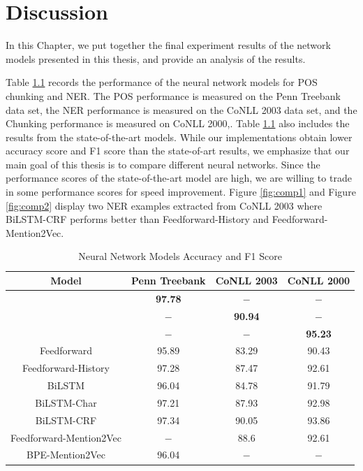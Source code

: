 \chapter{Discussion}

In this Chapter, we put together the final experiment results of the network models presented in this thesis, and provide an analysis of the results.

Table \ref{table:my-label1} records the performance of the neural network models for POS chunking and NER. The POS performance is measured on the Penn Treebank data set, the NER performance is measured on the CoNLL 2003 data set, and the Chunking performance is measured on CoNLL 2000,. Table \ref{table:my-label1} also includes the results from the state-of-the-art models. While our implementations obtain lower accuracy score and F1 score than the state-of-art results, we emphasize that our main goal of this thesis is to compare different neural networks. Since the performance scores of the state-of-the-art model are high, we are willing to trade in some performance scores for speed improvement. Figure \ref{fig:comp1} and Figure \ref{fig:comp2} display two NER examples extracted from CoNLL 2003 where BiLSTM-CRF performs better than Feedforward-History and Feedforward-Mention2Vec. 


\begin{table}[]
\centering
\caption{Neural Network Models Accuracy and F1 Score}
\label{table:my-label1}
\begin{tabular}{|c|c|c|c|}
\hline
Model        & Penn Treebank & CoNLL 2003 & CoNLL 2000     \\ \hline
\text{\cite{ling2015finding}} & \textbf{97.78} & $-$ & $-$ \\ \hline
\text{\cite{lample2016neural}} & $-$ & \textbf{90.94}  & $-$\\ \hline 
\text{\cite{shen2005voting}} & $-$  & $-$ & \textbf{95.23}\\ \hline 
Feedforward    & 95.89          & 83.29   & 90.43  \\ \hline
Feedforward-History & 97.28     & 87.47   & 92.61     \\ \hline
BiLSTM  & 96.04     & 84.78     & 91.79         \\ \hline
BiLSTM-Char & 97.21 & 87.93     & 92.98       \\ \hline
BiLSTM-CRF & 97.34  & 90.05  & 93.86     \\ \hline
Feedforward-Mention2Vec  & $-$    & 88.6  & 92.61  \\ \hline
BPE-Mention2Vec & 96.04  & $-$   & $-$   \\ \hline   
\end{tabular}
\end{table}


